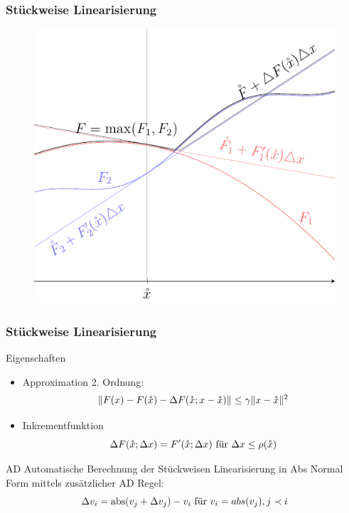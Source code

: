 \begin{frame}[<+->]
\frametitle{Stückweise Linearisierung}
\begin{figure}
\centering
\includegraphics[width=0.65\linewidth]{../dipl_tex/img/tikz/piecewise_linearization.pdf}
\end{figure}
\end{frame}

\begin{frame}[<+->]
\frametitle{Stückweise Linearisierung}
\begin{block}{Eigenschaften}
 \begin{itemize}
  \item Approximation 2. Ordnung: \[\|F(x) - F(\mathring{x})- \Delta F(\mathring{x};x-\mathring{x})\| \leq \gamma \|x-\mathring{x}\|^2\]
  \item Inkrementfunktion 
    \[\Delta F(\mathring{x};\Delta x) = F'(\mathring{x};\Delta x)~ \text{für } \Delta x \leq \rho(\mathring{x})\]
  
 \end{itemize}
\end{block}
\begin{block}{AD}
 Automatische Berechnung der Stückweisen Linearisierung in Abs Normal Form mittels zusätzlicher AD Regel:
 \[
    \Delta v_i =\operatorname{abs}(v_j + \Delta v_j) - v_i \text{ für } v_i = abs(v_j), j\prec i
 \]
\end{block}

\end{frame}
